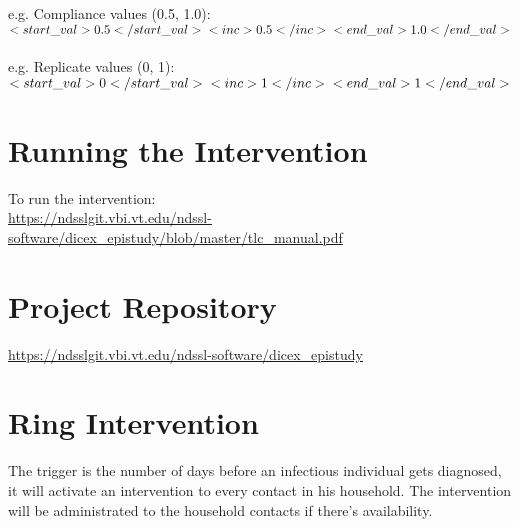 \documentclass[11pt]{article}
\begin{document}
e.g. Compliance values (0.5, 1.0):\\
$<start\_val>0.5</start\_val>\\
    <inc>0.5</inc>\\
    <end\_val>1.0</end\_val>$
    \\\\
e.g. Replicate values (0, 1):\\
$<start\_val>0</start\_val>\\
    <inc>1</inc>\\
    <end\_val>1</end\_val>$
    
\section{Running the Intervention} 
To run the intervention: \\
\url{https://ndsslgit.vbi.vt.edu/ndssl-software/dicex_epistudy/blob/master/tlc_manual.pdf}

\section{Project Repository}
\url{https://ndsslgit.vbi.vt.edu/ndssl-software/dicex_epistudy}

\section{Ring Intervention} 
The trigger is the number of days before an infectious individual gets diagnosed, it will activate an intervention to every contact in his household. The intervention will be administrated to the household contacts if there's availability.
\end{document}
